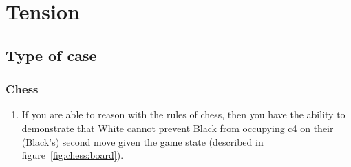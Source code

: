 \documentclass[10pt]{article}
\begin{document}

\newpage

\section{Tension}
\label{sec:tension}

\subsection{Type of case}
\label{sec:type-case}

\subsubsection{Chess}
\label{sec:chess}

\begin{note}[Information]
\begin{enumerate}
\item\label{chess:claim:1}\label{chess:claim:1:conditional} If you are able to reason with the rules of chess, then you have the ability to demonstrate that White cannot prevent Black from occupying c4 on their (Black's) second move given the game state (described in figure~\ref{fig:chess:board}).
\end{enumerate}
\end{note}
\end{document}
